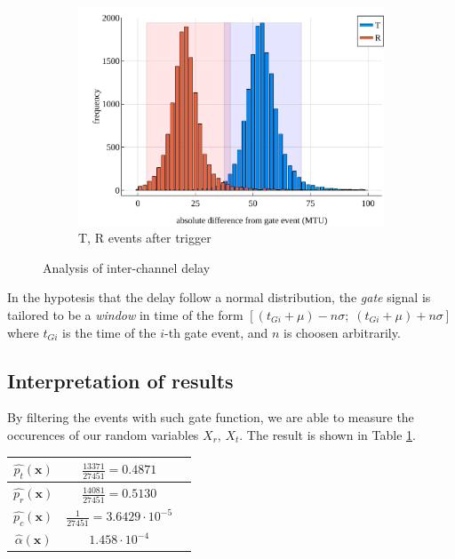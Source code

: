 \documentclass[10pt, final]{article}
\begin{document}
\begin{multicols}{2}
\begin{mdframed}
\begin{figure}[H]
        \begin{subfigure}{\textwidth}
            \centering
            \includegraphics[width = \textwidth]{../images/after.pdf}
            \caption{T, R events after trigger}
            \label{after}
        \end{subfigure}
        \caption{Analysis of inter-channel delay}
    \end{figure}
\end{mdframed}
In the hypotesis that the delay follow a normal distribution, the \emph{gate} signal is tailored to be a \emph{window} in time of the form $[(t_{Gi} + \mu) -n\sigma; \; (t_{Gi} + \mu) + n\sigma]$ where $t_{Gi}$ is the time of the $i$-th gate event, and $n$ is choosen arbitrarily.

\subsection*{Interpretation of results}
By filtering the events with such gate function, we are able to measure the occurences of our random variables $X_r, \, X_t$. The result is shown in Table \ref{result}.
\renewcommand{\arraystretch}{2}
\begin{mdframed}
    \begin{table}[H]
        \begin{tabular}{|c|c|c|}
            \hline
            $\widehat{p_t} (\mathbf{x})$ & $\frac{13371}{27451} = 0.4871$ & \\
            \hline
            $\widehat{p_r} (\mathbf{x})$ & $\frac{14081}{27451} = 0.5130$ & \\
            \hline
            $\widehat{p_c} (\mathbf{x})$ & $\frac{1}{27451} = 3.6429 \cdot 10^{-5}$ & \\
            \hline
            $\widehat{\alpha} (\mathbf{x})$ & $1.458 \cdot 10^{-4}$ & \\
            \hline
        \end{tabular}
        \label{result}
    \end{table}
\end{mdframed}




\end{multicols}
\end{document}
